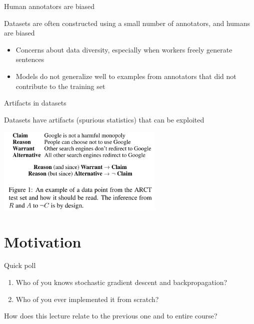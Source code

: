 \documentclass[12pt,aspectratio=169,handout]{beamer}
\begin{document}
\begin{frame}{ Human annotators are biased}

Datasets are often constructed using a small number of annotators, and humans are biased

\begin{itemize}
	\item Concerns about data diversity, especially when workers freely generate sentences
	\item Models do not generalize well to examples from annotators that did not contribute to the training set
\end{itemize}


\end{frame} \begin{frame}{Artifacts in datasets}

Datasets have artifacts (spurious statistics) that can be exploited

\includegraphics[width=8cm]{img/arct.png}





\end{frame}


\section{Motivation}

\begin{frame}{Quick poll}
	
	\begin{enumerate}
		\item Who of you knows stochastic gradient descent and backpropagation?
		\pause
		\item Who of you ever implemented it from scratch?
		\pause
	\end{enumerate}
	
	How does this lecture relate to the previous one and to entire course?
\end{frame}
\end{document}
